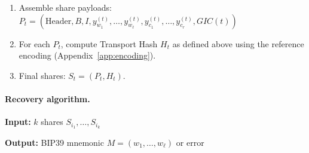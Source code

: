 \documentclass[11pt]{article}
\begin{document}
\begin{enumerate}[noitemsep]
\begin{itemize}[noitemsep]
        \begin{itemize}[noitemsep]
            \item Word-sum check: verify $\sum_{i=1}^{\ell} y_{w_i}^{(t)} + t \equiv GIC(t) \pmod{2053}$
            \item Checksum-sum check: verify $\sum_{j=1}^{r} y_{c_j}^{(t)} + t \equiv GIC(t) \pmod{2053}$
        \end{itemize}
    \end{itemize}
    \item Assemble share payloads: $P_t = (\text{Header}, B, I, y_{w_1}^{(t)}, \ldots, y_{w_\ell}^{(t)}, y_{c_1}^{(t)}, \ldots, y_{c_r}^{(t)}, GIC(t))$
    \item For each $P_t$, compute Transport Hash $H_t$ as defined above using the reference encoding (Appendix~\ref{app:encoding}).
    \item Final shares: $S_t = (P_t, H_t)$.
\end{enumerate}

\paragraph{Recovery algorithm.}

\textbf{Input:} $k$ shares $S_{i_1}, \ldots, S_{i_k}$

\textbf{Output:} BIP39 mnemonic $M = (w_1, \ldots, w_\ell)$ or error
\end{document}

